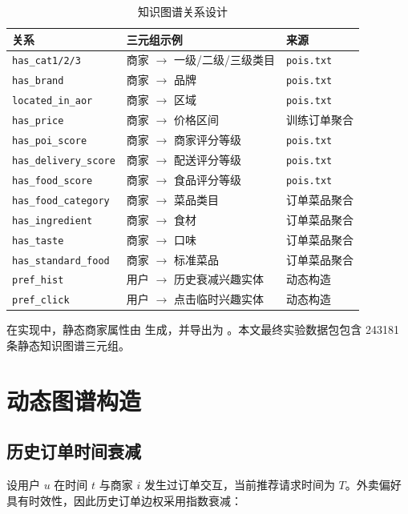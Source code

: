 \documentclass[UTF8,a4paper,12pt]{ctexart}
\begin{document}
\begin{table}[htbp]
\centering
\caption{知识图谱关系设计}
\begin{tabular}{p{4.5cm}p{7.0cm}p{3.0cm}}
\toprule
关系 & 三元组示例 & 来源 \\
\midrule
\texttt{has\_cat1/2/3} & 商家 $\rightarrow$ 一级/二级/三级类目 & \texttt{pois.txt}\\
\texttt{has\_brand} & 商家 $\rightarrow$ 品牌 & \texttt{pois.txt}\\
\texttt{located\_in\_aor} & 商家 $\rightarrow$ 区域 & \texttt{pois.txt}\\
\texttt{has\_price} & 商家 $\rightarrow$ 价格区间 & 训练订单聚合\\
\texttt{has\_poi\_score} & 商家 $\rightarrow$ 商家评分等级 & \texttt{pois.txt}\\
\texttt{has\_delivery\_score} & 商家 $\rightarrow$ 配送评分等级 & \texttt{pois.txt}\\
\texttt{has\_food\_score} & 商家 $\rightarrow$ 食品评分等级 & \texttt{pois.txt}\\
\texttt{has\_food\_category} & 商家 $\rightarrow$ 菜品类目 & 订单菜品聚合\\
\texttt{has\_ingredient} & 商家 $\rightarrow$ 食材 & 订单菜品聚合\\
\texttt{has\_taste} & 商家 $\rightarrow$ 口味 & 订单菜品聚合\\
\texttt{has\_standard\_food} & 商家 $\rightarrow$ 标准菜品 & 订单菜品聚合\\
\texttt{pref\_hist} & 用户 $\rightarrow$ 历史衰减兴趣实体 & 动态构造\\
\texttt{pref\_click} & 用户 $\rightarrow$ 点击临时兴趣实体 & 动态构造\\
\bottomrule
\end{tabular}
\end{table}

在实现中，静态商家属性由  生成，并导出为 。本文最终实验数据包包含 243181 条静态知识图谱三元组。

\section{动态图谱构造}

\subsection{历史订单时间衰减}

设用户 $u$ 在时间 $t$ 与商家 $i$ 发生过订单交互，当前推荐请求时间为 $T$。外卖偏好具有时效性，因此历史订单边权采用指数衰减：
\end{document}
